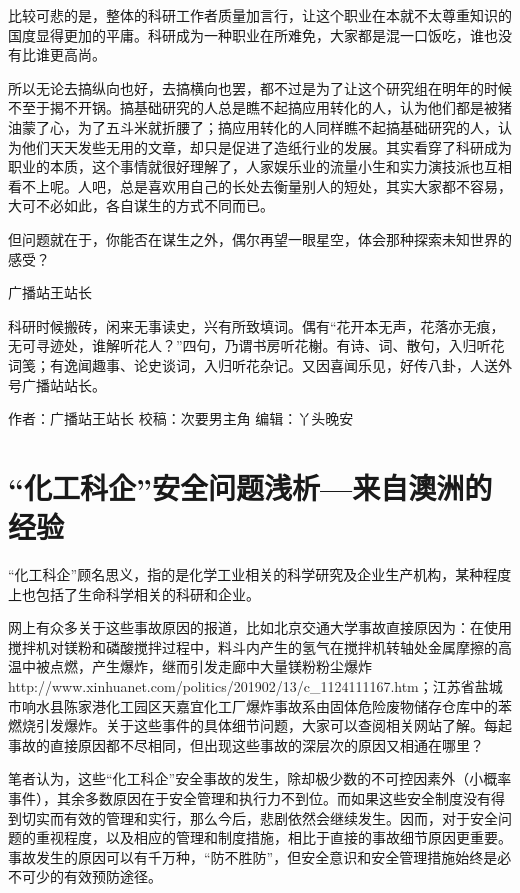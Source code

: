 \documentclass[
]{book}
\begin{document}
比较可悲的是，整体的科研工作者质量加言行，让这个职业在本就不太尊重知识的国度显得更加的平庸。科研成为一种职业在所难免，大家都是混一口饭吃，谁也没有比谁更高尚。

所以无论去搞纵向也好，去搞横向也罢，都不过是为了让这个研究组在明年的时候不至于揭不开锅。搞基础研究的人总是瞧不起搞应用转化的人，认为他们都是被猪油蒙了心，为了五斗米就折腰了；搞应用转化的人同样瞧不起搞基础研究的人，认为他们天天发些无用的文章，却只是促进了造纸行业的发展。其实看穿了科研成为职业的本质，这个事情就很好理解了，人家娱乐业的流量小生和实力演技派也互相看不上呢。人吧，总是喜欢用自己的长处去衡量别人的短处，其实大家都不容易，大可不必如此，各自谋生的方式不同而已。

但问题就在于，你能否在谋生之外，偶尔再望一眼星空，体会那种探索未知世界的感受？

广播站王站长

科研时候搬砖，闲来无事读史，兴有所致填词。偶有``花开本无声，花落亦无痕，无可寻迹处，谁解听花人？''四句，乃谓书房听花榭。有诗、词、散句，入归听花词笺；有逸闻趣事、论史谈词，入归听花杂记。又因喜闻乐见，好传八卦，人送外号广播站站长。

作者：广播站王站长
校稿：次要男主角
编辑：丫头晚安

\hypertarget{ux5316ux5de5ux79d1ux4f01ux5b89ux5168ux95eeux9898ux6d45ux6790ux6765ux81eaux6fb3ux6d32ux7684ux7ecfux9a8c}{%
\section{``化工科企''安全问题浅析---来自澳洲的经验}\label{ux5316ux5de5ux79d1ux4f01ux5b89ux5168ux95eeux9898ux6d45ux6790ux6765ux81eaux6fb3ux6d32ux7684ux7ecfux9a8c}}

``化工科企''顾名思义，指的是化学工业相关的科学研究及企业生产机构，某种程度上也包括了生命科学相关的科研和企业。

网上有众多关于这些事故原因的报道，比如北京交通大学事故直接原因为：在使用搅拌机对镁粉和磷酸搅拌过程中，料斗内产生的氢气在搅拌机转轴处金属摩擦的高温中被点燃，产生爆炸，继而引发走廊中大量镁粉粉尘爆炸http://www.xinhuanet.com/politics/201902/13/c\_1124111167.htm；江苏省盐城市响水县陈家港化工园区天嘉宜化工厂爆炸事故系由固体危险废物储存仓库中的苯燃烧引发爆炸。关于这些事件的具体细节问题，大家可以查阅相关网站了解。每起事故的直接原因都不尽相同，但出现这些事故的深层次的原因又相通在哪里？

笔者认为，这些``化工科企''安全事故的发生，除却极少数的不可控因素外（小概率事件），其余多数原因在于安全管理和执行力不到位。而如果这些安全制度没有得到切实而有效的管理和实行，那么今后，悲剧依然会继续发生。因而，对于安全问题的重视程度，以及相应的管理和制度措施，相比于直接的事故细节原因更重要。事故发生的原因可以有千万种，``防不胜防''，但安全意识和安全管理措施始终是必不可少的有效预防途径。
\end{document}
